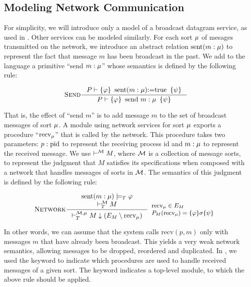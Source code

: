 \subsection{Modeling Network Communication}

For simplicity, we will introduce only a model of a broadcast datagram
service, as used in \Toy. Other services can be modeled similarly. For
each sort $\mu$ of mesages transmitted on the network, we introduce an
abstract relation $\mbox{sent}(m:\mu)$ to represent the fact that message
$m$ has been broadcast in the past.  We add to the language a
primitive ``send $m:\mu$'' whose semantics is defined by the
following rule:
\begin{small}
\[{\irule{Send}\inference{ P \vdash \bra{\phi} \Sent(m:\Msg) \Asgn \mbox{true} \ket{\psi} }
            { P \vdash \bra{\phi} \mbox{send $m:\Msg$} \ket{\psi} }}
 \]
\end{small}

That is, the effect of ``send $m$'' is to add message $m$ to the set
of broadcast messages of sort $\mu$. A module using network services
for sort $\mu$ exports a procedure ``$\mbox{recv}_{\mu}$'' that is called
by the network. This procedure takes two parameters: $p:\mbox{pid}$ to
represent the receiving process id and $m:\mu$ to represent the
received message.  We use $\vdash^{\mathcal{M}} M$, where $\mathcal{M}$ is a
collection of message sorts, to represent the judgment that $M$
satisfies its specifications when composed with a network that handles
messages of sorts in $\mathcal{M}$.
The semantics of this judgment is defined by the following rule:
\begin{small}
\[{\irule{Network}\inference{ \Sent(m:\Msg) \models_T \phi \\ \vdash_T^{\Msgs} M}
             { \vdash_T^{\Msgs,\Msg} M \Restr (E_M \setminus \Recv{\Msg}) }}
{
  \begin{small}
  \begin{array}{l}
    \Recv{\Msg} \in E_M \\
    P_M(\Recv{\Msg}) = \{ \phi \} \sigma \{ \psi \}
  \end{array}
  \end{small}
}
 \]
\end{small}

 \begin{sloppypar}
In other words, we can assume that the system calls $\mbox{recv}(p,m)$ only
 with messages $m$ that have already been broadcast.  This
 yields a very weak network semantics, allowing messages to be
 dropped, reordered and duplicated. In \Lang, we used the keyword  to indicate
which procedures are used to handle received messages of a given sort. The keyword  indicates
a top-level module, to which the above rule should be applied.
\end{sloppypar}

